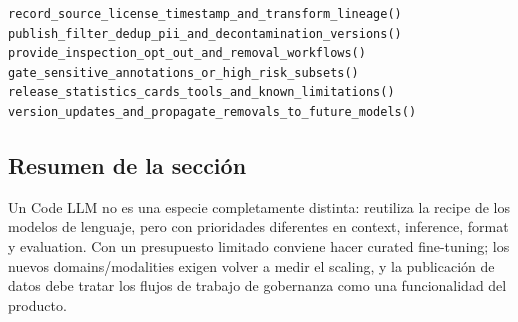 \begin{lstlisting}[caption={Checklist previa a la publicación de un conjunto de datos de entrenamiento grande}]
record_source_license_timestamp_and_transform_lineage()
publish_filter_dedup_pii_and_decontamination_versions()
provide_inspection_opt_out_and_removal_workflows()
gate_sensitive_annotations_or_high_risk_subsets()
release_statistics_cards_tools_and_known_limitations()
version_updates_and_propagate_removals_to_future_models()
\end{lstlisting}


\subsection{Resumen de la sección}

Un Code LLM no es una especie completamente distinta: reutiliza la recipe de los modelos de lenguaje, pero con prioridades diferentes en context, inference, format y evaluation. Con un presupuesto limitado conviene hacer curated fine-tuning; los nuevos domains/modalities exigen volver a medir el scaling, y la publicación de datos debe tratar los flujos de trabajo de gobernanza como una funcionalidad del producto.
